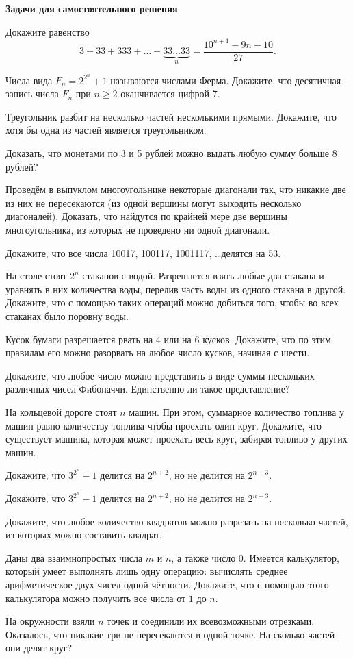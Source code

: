 {\bf Задачи для самостоятельного решения}
\begin{problems}
\item
Докажите равенство $$3 + 33 + 333 + \ldots + \underbrace{33 \ldots 33}_n = \dfrac{10^{n+1} - 9n - 10}{27}.$$
\item Числа вида $F_n = 2^{2^n} + 1$ называются числами Ферма. Докажите, что десятичная запись числа $F_n$ при $n \geqslant 2$ оканчивается цифрой 7.
\item Треугольник разбит на несколько частей несколькими прямыми. Докажите, что хотя бы одна из частей является треугольником.
\item Доказать, что монетами по 3 и 5 рублей можно выдать любую сумму больше 8 рублей?
\item Проведём в выпуклом многоугольнике некоторые диагонали так, что никакие две из них не пересекаются (из одной вершины могут выходить несколько диагоналей). Доказать, что найдутся по крайней мере две вершины многоугольника, из которых не проведено ни одной диагонали.
\item Докажите, что все числа 10017, 100117, 1001117, \ldots делятся на 53.
\item На столе стоят $2^n$ стаканов с водой. Разрешается взять любые два стакана и уравнять в них количества воды, перелив часть воды из одного стакана в другой. Докажите, что с помощью таких операций можно добиться того, чтобы во всех стаканах было поровну воды. 
\item Кусок бумаги разрешается рвать на 4 или на 6 кусков. Докажите, что по этим правилам его можно разорвать на любое число кусков, начиная с шести.
\item Докажите, что любое число можно представить в виде суммы нескольких различных чисел Фибоначчи. Единственно ли такое представление?
\item На кольцевой дороге стоят $n$ машин. При этом, суммарное количество топлива у машин  равно количеству топлива чтобы проехать один круг. Докажите, что существует машина, которая может проехать весь круг, забирая топливо у других машин.
\item Докажите, что $3^{2^n} - 1$ делится на $2^{n+2}$, но не делится на $2^{n+3}$.

\item Докажите, что $3^{2^n} - 1$ делится на $2^{n+2}$, но не делится на $2^{n+3}$.
\item Докажите,  что любое количество квадратов можно разрезать на несколько частей, из которых можно составить квадрат.
\item Даны два взаимнопростых числа $m$ и $n$, а также число 0. Имеется калькулятор, который умеет выполнять лишь одну операцию: вычислять среднее арифметическое двух чисел одной чётности. Докажите, что с помощью этого калькулятора можно получить все числа от $1$ до $n$.
\item  На окружности взяли $n$ точек и соединили их всевозможными отрезками. Оказалось, что никакие три не пересекаются в одной точке. На сколько частей они делят круг?
\end{problems}
